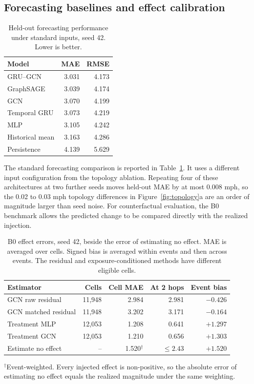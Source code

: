 \documentclass[sigconf,nonacm]{acmart}
\begin{document}
\subsection{Forecasting baselines and effect calibration}
\begin{table}[t]
\centering
\caption{Held-out forecasting performance under standard inputs, seed 42. Lower is better.}
\label{tab:forecast}
\footnotesize
\begin{tabular}{lrr}
\toprule
Model & MAE & RMSE \\
\midrule
GRU--GCN & 3.031 & 4.173 \\
GraphSAGE & 3.039 & 4.174 \\
GCN & 3.070 & 4.199 \\
Temporal GRU & 3.073 & 4.219 \\
MLP & 3.105 & 4.242 \\
Historical mean & 3.163 & 4.286 \\
Persistence & 4.139 & 5.629 \\
\bottomrule
\end{tabular}
\end{table}

The standard forecasting comparison is reported in Table~\ref{tab:forecast}. It uses a different input configuration from the topology ablation. Repeating four of these architectures at two further seeds moves held-out MAE by at most 0.008 mph, so the 0.02 to 0.03 mph topology differences in Figure~\ref{fig:topology}a are an order of magnitude larger than seed noise. For counterfactual evaluation, the B0 benchmark allows the predicted change to be compared directly with the realized injection.

\begin{table}[t]
\centering
\caption{B0 effect errors, seed 42, beside the error of estimating no effect. MAE is averaged over cells. Signed bias is averaged within events and then across events. The residual and exposure-conditioned methods have different eligible cells.}
\label{tab:estimators}
\footnotesize
\begin{tabular}{lrrrr}
\toprule
Estimator & Cells & Cell MAE & At 2 hops & Event bias \\
\midrule
GCN raw residual & 11,948 & 2.984 & 2.981 & $-0.426$ \\
GCN matched residual & 11,948 & 3.202 & 3.171 & $-0.164$ \\
Treatment MLP & 12,053 & 1.208 & 0.641 & $+1.297$ \\
Treatment GCN & 12,053 & 1.210 & 0.656 & $+1.303$ \\
\midrule
Estimate no effect & -- & 1.520$^{\dagger}$ & $\le 2.43$ & $+1.520$ \\
\bottomrule
\end{tabular}

\vspace{2pt}
\footnotesize $^{\dagger}$Event-weighted. Every injected effect is non-positive, so the absolute error of estimating no effect equals the realized magnitude under the same weighting.
\end{table}
\end{document}
